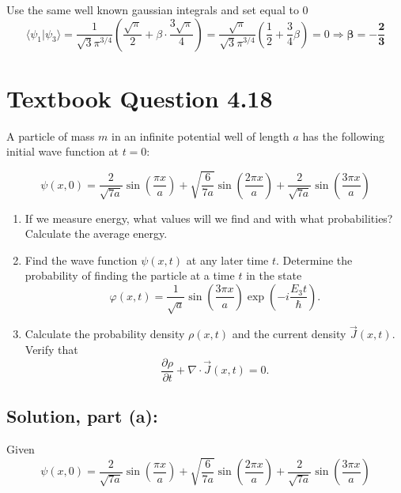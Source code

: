 \documentclass[12pt]{article}
\begin{document}
        Use the same well known gaussian integrals and set equal to 0
        \[
            \langle \psi_1 | \psi_3 \rangle = \frac{1}{\sqrt{3} \pi^{3/4}} \left( \frac{\sqrt{\pi}}{2} + \beta \cdot \frac{3\sqrt{\pi}}{4} \right) = \frac{\sqrt{\pi}}{\sqrt{3} \pi^{3/4}} \left( \frac{1}{2} + \frac{3}{4} \beta \right) = 0 \Rightarrow \boldsymbol{\boxed{\beta = -\frac{2}{3}}}
        \]

\section{Textbook Question 4.18}
    A particle of mass \( m \) in an infinite potential well of length \( a \) has the following initial wave function at \( t = 0 \):
    
    \[
        \psi(x,0) = \frac{2}{\sqrt{7a}} \sin\left( \frac{\pi x}{a} \right) 
        + \sqrt{\frac{6}{7a}} \sin\left( \frac{2\pi x}{a} \right) 
        + \frac{2}{\sqrt{7a}} \sin\left( \frac{3\pi x}{a} \right)
    \]
    
    \begin{enumerate}
        \item[(a)] If we measure energy, what values will we find and with what probabilities? Calculate the average energy.
    
        \item[(b)] Find the wave function \( \psi(x,t) \) at any later time \( t \). Determine the probability of finding the particle at a time \( t \) in the state
        \[
            \varphi(x,t) = \frac{1}{\sqrt{a}} \sin\left( \frac{3\pi x}{a} \right) \exp\left( -i \frac{E_3 t}{\hbar} \right).
        \]
    
        \item[(c)] Calculate the probability density \( \rho(x,t) \) and the current density \( \vec{J}(x,t) \). Verify that
        \[
            \frac{\partial \rho}{\partial t} + \nabla \cdot \vec{J}(x,t) = 0.
        \]
    \end{enumerate}

    \subsection{Solution, part (a):}
        Given
        \begin{equation} \label{eq: g}
            \psi(x, 0) = \frac{2}{\sqrt{7a}} \sin\left( \frac{\pi x}{a} \right) +
            \sqrt{\frac{6}{7a}} \sin\left( \frac{2\pi x}{a} \right) +
            \frac{2}{\sqrt{7a}} \sin\left( \frac{3\pi x}{a} \right)
        \end{equation}
\end{document}
